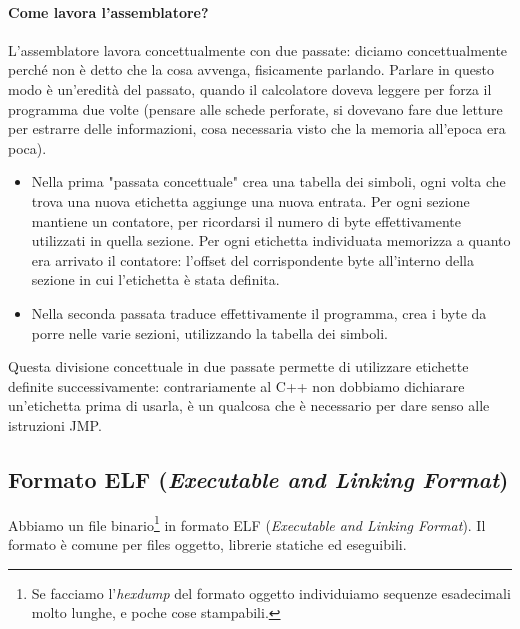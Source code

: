 \documentclass[11pt]{report}
\theoremstyle{definition}
\begin{document}
\paragraph{Come lavora l'assemblatore?} L'assemblatore lavora concettualmente con due passate: diciamo concettualmente perché non è detto che la cosa avvenga, fisicamente parlando. Parlare in questo modo è un'eredità del passato, quando il calcolatore doveva leggere per forza il programma due volte (pensare alle schede perforate, si dovevano fare due letture per estrarre delle informazioni, cosa necessaria visto che la memoria all'epoca era poca).
\begin{itemize}
\item Nella prima "passata concettuale" crea una tabella dei simboli, ogni volta che trova una nuova etichetta aggiunge una nuova entrata. Per ogni sezione mantiene un contatore, per ricordarsi il numero di byte effettivamente utilizzati in quella sezione. Per ogni etichetta individuata memorizza a quanto era arrivato il contatore: l'offset del corrispondente byte all'interno della sezione in cui l'etichetta è stata definita.
\item Nella seconda passata traduce effettivamente il programma, crea i byte da porre nelle varie sezioni, utilizzando la tabella dei simboli. 
\end{itemize}
Questa divisione concettuale in due passate permette di utilizzare etichette definite successivamente: contrariamente al C++ non dobbiamo dichiarare un'etichetta prima di usarla, è un qualcosa che è necessario per dare senso alle istruzioni JMP.

\subsection{Formato ELF (\emph{Executable and Linking Format})} Abbiamo un file binario\footnote{Se facciamo l'\emph{hexdump} del formato oggetto individuiamo sequenze esadecimali molto lunghe, e poche cose stampabili.} in formato ELF (\emph{Executable and Linking Format}). Il formato è comune per files oggetto, librerie statiche ed eseguibili.
\end{document}
